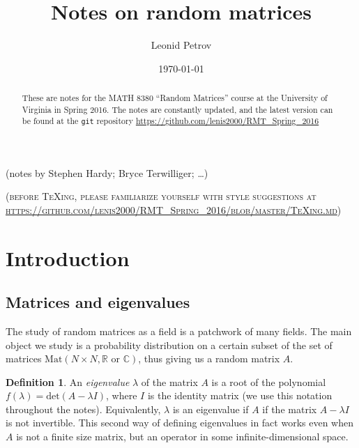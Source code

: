 \documentclass[letterpaper,11pt,oneside,reqno]{amsart}
\numberwithin{equation}{section}
\newcommand{\note}[1]{\textsc{\color{blue}(#1)}}
\newcounter{lecture}
\newcommand{\lect}[1]{\bigskip\addtocounter{lecture}{1}\noindent{\Large\textbf{\color{red}Lecture \#\arabic{lecture} on #1 \hrulefill}}\bigskip}
\theoremstyle{definition}
\newtheorem{definition}[proposition]{Definition}
\begin{document}
\title[Notes on random matrices]{Notes on random matrices}

\author[L. Petrov]{Leonid Petrov}
\date{\today}
\maketitle

\begin{center}
	(notes by 
	Stephen Hardy;
	Bryce Terwilliger; \ldots)
\end{center}

\begin{abstract}
	These are notes for the MATH 8380 ``Random Matrices'' course at the
	University of Virginia in Spring 2016. The notes are constantly updated,
	and the latest version can be found at the \texttt{git} repository
	\url{https://github.com/lenis2000/RMT_Spring_2016}
\end{abstract}

\bigskip

\begin{center}
\noindent\note{before \TeX{}ing, please familiarize yourself with style suggestions at\\
\url{https://github.com/lenis2000/RMT_Spring_2016/blob/master/TeXing.md}}
\end{center}
\bigskip

\setcounter{tocdepth}{1}
\tableofcontents
\setcounter{tocdepth}{3}

\lect{1/20/2016}

\section{Introduction} %
\label{sec:introduction}

\subsection{Matrices and eigenvalues} %
\label{sub:object_of_study}

The study of random matrices as a field is a patchwork of many fields.  The
main object we study is a probability distribution on a certain subset of the
set of matrices $\mathrm{Mat}(N\times N,\mathbb R \text{ or } \mathbb C)$,
thus giving us a random matrix $A$.

\begin{definition}
An {\it eigenvalue} $\lambda$ of the matrix $A$ is a root of the polynomial
$f(\lambda)=\text{det}(A-\lambda I)$, where $I$ is the identity matrix 
(we use this notation throughout the notes).  
Equivalently, $\lambda$ is an
eigenvalue if $A$ if the matrix $A-\lambda I$ is not invertible. This second
way of defining eigenvalues in fact works even when $A$ is not a finite
size matrix, but an operator in some infinite-dimensional space.
\end{definition}
\end{document}
